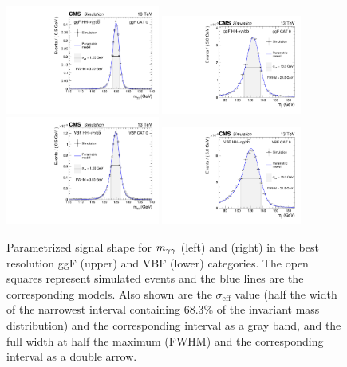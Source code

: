 \documentclass[11pt,twoside,a4paper,cmspaper,final,collab]{cms-tdr}
\begin{document}
\begin{figure} [hbtp]
	\centering
		{\includegraphics[width=0.45\textwidth]{Figure_007-a.pdf}}
		{\includegraphics[width=0.41\textwidth]{Figure_007-b.pdf}}\\
		{\includegraphics[width=0.45\textwidth]{Figure_007-c.pdf}}
		{\includegraphics[width=0.41\textwidth]{Figure_007-d.pdf}}
  \caption{Parametrized signal shape for $m_{\gamma\gamma}$ (left) and \Mjj (right) in the best resolution ggF (upper) and VBF (lower) categories. The open
  squares represent simulated events and the blue lines are the
  corresponding models. Also shown are the $\sigma_{\text{eff}}$ value
  (half the width of the narrowest interval containing 68.3\% of the
  invariant mass distribution) and the corresponding interval as a gray
  band, and the full width at half the maximum (FWHM) and the corresponding
  interval as a double arrow.}
		\label{fig:statAnalysisSigPlots}
\end{figure}
\end{document}
